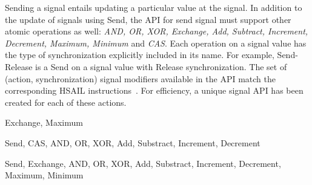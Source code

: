 \documentclass[final]{book}
\begin{document}
Sending a signal entails updating a particular value at the signal. In addition
to the update of signals using Send, the API for send signal must support other
atomic operations as well: \emph {AND, OR, XOR, Exchange, Add, Subtract,
  Increment, Decrement, Maximum, Minimum} and \emph{CAS}. Each operation on a
signal value has the type of synchronization explicitly included in its
name. For example, Send-Release is a Send on a signal value with Release
synchronization. The set of (action, synchronization) signal modifiers available
in the API match the corresponding HSAIL instructions~\cite{prm}. For
efficiency, a unique signal API has been created for each of these actions.



\begin{description}[font=\it, leftmargin=1.5em]
\item[Acquire-Release synchronization] Exchange, Maximum
\item[Release synchronization] Send, CAS, AND, OR, XOR, Add, Substract, Increment, Decrement
\item[Relaxed synchronization] Send, Exchange, AND, OR, XOR, Add, Substract, Increment, Decrement, Maximum, Minimum
\end{description}
\end{document}
